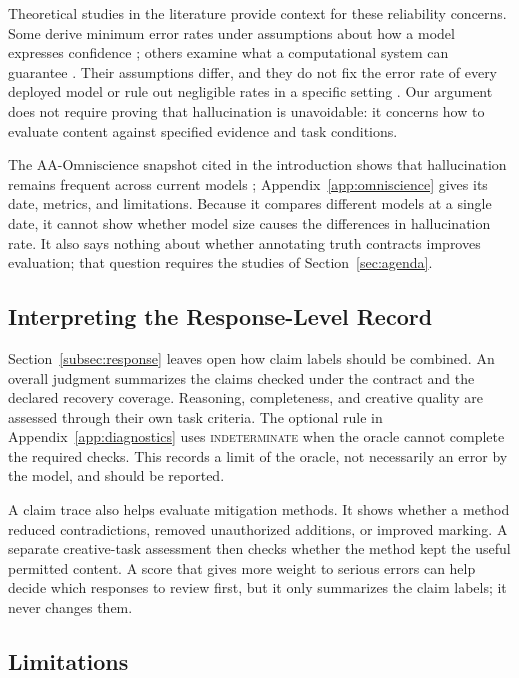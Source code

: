 \documentclass{clv2025}
\begin{document}
Theoretical studies in the literature provide context for these
reliability concerns. Some derive minimum error rates under assumptions
about how a model expresses confidence \citep{kalai_calibrated_2024};
others examine what a computational system can guarantee
\citep{xu_hallucination_2024,banerjee_llms_2024}.
Their assumptions differ, and they do not fix the error rate of every
deployed model or rule out negligible rates in a specific setting
\citep{suzuki_negligible_2025}. Our argument does not require proving that
hallucination is unavoidable: it concerns how to evaluate content against
specified evidence and task conditions.

The AA-Omniscience snapshot cited in the introduction shows that
hallucination remains frequent across current models
\citep{jackson_aaomniscience_2025,artificialanalysis_omniscience_leaderboard_2026};
Appendix~\ref{app:omniscience} gives its date, metrics, and limitations.
Because it compares different models at a single date, it cannot show
whether model size causes the differences in hallucination rate. It also
says nothing about whether annotating truth contracts improves evaluation;
that question requires the studies of Section~\ref{sec:agenda}.

\subsection{Interpreting the Response-Level Record}

Section~\ref{subsec:response} leaves open how claim labels should be combined.
An overall judgment summarizes the claims checked under the contract and
the declared recovery coverage. Reasoning, completeness, and creative
quality are assessed through their own task criteria. The optional rule in
Appendix~\ref{app:diagnostics} uses \textsc{indeterminate} when the oracle
cannot complete the required checks. This records a limit of the oracle,
not necessarily an error by the model, and should be reported.

A claim trace also helps evaluate mitigation methods. It shows whether a
method reduced contradictions, removed unauthorized additions, or improved
marking. A separate creative-task assessment then checks whether the method
kept the useful permitted content. A score that gives more weight to
serious errors can help decide which responses to review first, but it only
summarizes the claim labels; it never changes them.

\subsection{Limitations}
\end{document}
